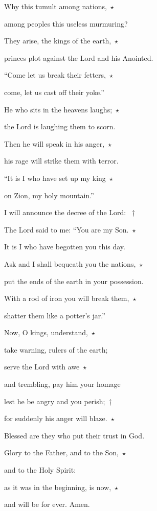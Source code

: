 \noindent Why this tumult among nations,~$\star$~\nopagebreak

among peoples this useless murmuring?

\noindent They arise, the kings of the earth,~$\star$~\nopagebreak

princes plot against the Lord and his Anointed.

\noindent “Come let us break their fetters,~$\star$~\nopagebreak

come, let us cast off their yoke.”

\noindent He who sits in the heavens laughs;~$\star$~\nopagebreak

the Lord is laughing them to scorn.

\noindent Then he will speak in his anger,~$\star$~\nopagebreak

his rage will strike them with terror.

\noindent “It is I who have set up my king~$\star$~\nopagebreak

on Zion, my holy mountain.”

\noindent I will announce the decree of the Lord: ~†~\nopagebreak

The Lord said to me: “You are my Son.~$\star$~\nopagebreak

It is I who have begotten you this day.

\noindent Ask and I shall bequeath you the nations,~$\star$~\nopagebreak

put the ends of the earth in your possession.

\noindent With a rod of iron you will break them,~$\star$~\nopagebreak

shatter them like a potter’s jar.”

\noindent Now, O kings, understand,~$\star$~\nopagebreak

take warning, rulers of the earth;

\noindent serve the Lord with awe~$\star$~\nopagebreak

and trembling, pay him your homage

\noindent lest he be angry and you perish;~†~\nopagebreak

for suddenly his anger will blaze.~$\star$~\nopagebreak

Blessed are they who put their trust in God.

\noindent Glory to the Father, and to the Son,~$\star$~\nopagebreak

and to the Holy Spirit:

\noindent as it was in the beginning, is now,~$\star$~\nopagebreak

and will be for ever. Amen.